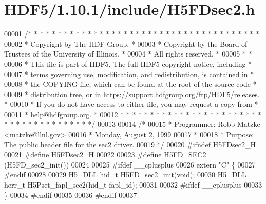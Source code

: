 \hypertarget{_h_d_f5_21_810_81_2include_2_h5_f_dsec2_8h_source}{}\section{H\+D\+F5/1.10.1/include/\+H5\+F\+Dsec2.h}
\label{_h_d_f5_21_810_81_2include_2_h5_f_dsec2_8h_source}

\begin{DoxyCode}
00001 \textcolor{comment}{/* * * * * * * * * * * * * * * * * * * * * * * * * * * * * * * * * * * * * * *}
00002 \textcolor{comment}{ * Copyright by The HDF Group.                                               *}
00003 \textcolor{comment}{ * Copyright by the Board of Trustees of the University of Illinois.         *}
00004 \textcolor{comment}{ * All rights reserved.                                                      *}
00005 \textcolor{comment}{ *                                                                           *}
00006 \textcolor{comment}{ * This file is part of HDF5.  The full HDF5 copyright notice, including     *}
00007 \textcolor{comment}{ * terms governing use, modification, and redistribution, is contained in    *}
00008 \textcolor{comment}{ * the COPYING file, which can be found at the root of the source code       *}
00009 \textcolor{comment}{ * distribution tree, or in https://support.hdfgroup.org/ftp/HDF5/releases.  *}
00010 \textcolor{comment}{ * If you do not have access to either file, you may request a copy from     *}
00011 \textcolor{comment}{ * help@hdfgroup.org.                                                        *}
00012 \textcolor{comment}{ * * * * * * * * * * * * * * * * * * * * * * * * * * * * * * * * * * * * * * */}
00013 
00014 \textcolor{comment}{/*}
00015 \textcolor{comment}{ * Programmer:  Robb Matzke <matzke@llnl.gov>}
00016 \textcolor{comment}{ *              Monday, August  2, 1999}
00017 \textcolor{comment}{ *}
00018 \textcolor{comment}{ * Purpose: The public header file for the sec2 driver.}
00019 \textcolor{comment}{ */}
00020 \textcolor{preprocessor}{#ifndef H5FDsec2\_H}
00021 \textcolor{preprocessor}{#define H5FDsec2\_H}
00022 
00023 \textcolor{preprocessor}{#define H5FD\_SEC2   (H5FD\_sec2\_init())}
00024 
00025 \textcolor{preprocessor}{#ifdef \_\_cplusplus}
00026 \textcolor{keyword}{extern} \textcolor{stringliteral}{"C"} \{
00027 \textcolor{preprocessor}{#endif}
00028 
00029 H5\_DLL hid\_t H5FD\_sec2\_init(\textcolor{keywordtype}{void});
00030 H5\_DLL herr\_t H5Pset\_fapl\_sec2(hid\_t fapl\_id);
00031 
00032 \textcolor{preprocessor}{#ifdef \_\_cplusplus}
00033 \}
00034 \textcolor{preprocessor}{#endif}
00035 
00036 \textcolor{preprocessor}{#endif}
00037 
\end{DoxyCode}
